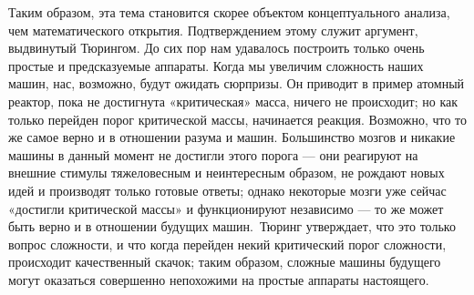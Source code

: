 \documentclass[../main.tex]{subfiles}
\begin{document}
Таким образом, эта тема становится скорее объектом концептуального анализа, чем математического открытия. Подтверждением этому служит аргумент, выдвинутый Тюрингом. До сих пор нам удавалось построить только очень простые и предсказуемые аппараты. Когда мы увеличим сложность наших машин, нас, возможно, будут ожидать сюрпризы. Он приводит в пример атомный реактор, пока не достигнута «критическая» масса, ничего не происходит; но как только перейден порог критической массы, начинается реакция. Возможно, что то же самое верно и в отношении разума и машин. Большинство мозгов и никакие машины в данный момент не достигли этого порога --- они реагируют на внешние стимулы тяжеловесным и неинтересным образом, не рождают новых идей и производят только готовые ответы; однако некоторые мозги уже сейчас «достигли критической массы» и функционируют независимо --- то же может быть верно и в отношении будущих машин.~Тюринг утверждает, что это только вопрос сложности, и что когда перейден некий критический порог сложности, происходит качественный скачок; таким образом, сложные машины будущего могут оказаться совершенно непохожими на простые аппараты настоящего.
\end{document}

